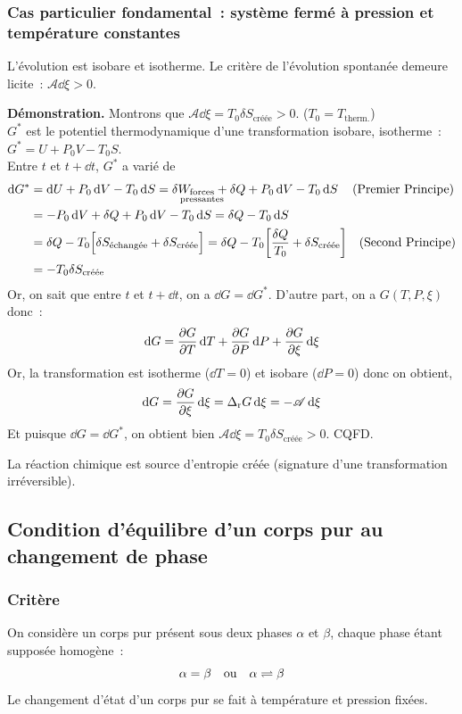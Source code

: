 \documentclass{article}
\newcommand{\Dr}{\Delta_{\mathrm{r}}}
\newcommand{\fp}{{\substack{\text{forces}\\\mathclap{\text{pressantes}}}}}
\newcommand{\creee}{\text{créée}}
\newcommand{\echangee}{\text{échangée}}
\begin{document}
\subsubsection{Cas particulier fondamental~: système fermé à pression et température constantes}
\begin{tableau}
    L'évolution est isobare et isotherme. Le critère de l'évolution spontanée demeure licite~: $\mathscr{A}\dd{\xi} >0$.
    \tcbline

\textbf{Démonstration.} Montrons que $\mathscr{A}\dd{\xi} = T_0\delta S_\creee>0$. ($T_0=T_{\text{therm.}}$)\\

$G^*$ est le potentiel thermodynamique d'une transformation isobare, isotherme~: $G^* = U+P_0V-T_0S$.\\
Entre $t$ et $t+\dd{t}$, $G^*$ a varié de
\begin{align*}
    \dd{G^*} &= \dd{U} +P_0\dd{V} - T_0\dd{S} = \delta W_\fp + \delta Q +P_0\dd{V} - T_0\dd{S}\quad\text{(Premier Principe)}\\
    &=-P_0\dd{V}+\delta Q +P_0\dd{V} - T_0\dd{S} = \delta Q - T_0\dd{S}\\
    &=\delta Q -T_0\Big[\delta S_\echangee + \delta S_\creee\Big] = \delta Q -T_0\bigg[\frac{\delta Q}{T_0} + \delta S_\creee\bigg]\quad\text{(Second Principe)}\\
    &=-T_0\delta S_\creee
\end{align*}
Or, on sait que entre $t$ et $t+\dd{t}$, on a $\dd{G} = \dd{G^*}$. D'autre part, on a $G(T,P,\xi)$ donc~:
$$\dd{G} = \pdv{G}{T}\dd{T} + \pdv{G}{P}\dd{P} + \pdv{G}{\xi}\dd{\xi}$$
Or, la transformation est isotherme ($\dd{T} = 0$) et isobare ($\dd{P} = 0$) donc on obtient,
$$\dd{G} = \pdv{G}{\xi}\dd{\xi} = \Dr G\dd{\xi} = -\mathscr{A}\dd{\xi}$$
Et puisque $\dd{G} = \dd{G^*}$, on obtient bien $\mathscr{A}\dd{\xi} = T_0\delta S_\creee>0$. CQFD.\\

\begin{important}[Interprétation]
    La réaction chimique est source d'entropie créée (signature d'une transformation irréversible).
\end{important}
\end{tableau}

\subsection{Condition d'équilibre d'un corps pur au changement de phase}
\subsubsection{Critère}
On considère un corps pur présent sous deux phases $\alpha$ et $\beta$, chaque phase étant supposée homogène~:
$$\alpha=\beta\qq{ou}\alpha \rightleftharpoons \beta$$
Le changement d'état d'un corps pur se fait à température et pression fixées.
\end{document}
